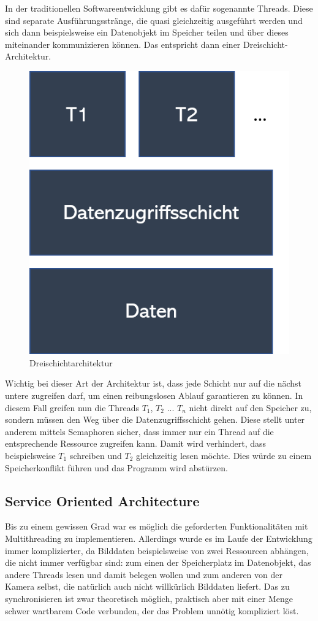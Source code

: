 In der traditionellen Softwareentwicklung gibt es dafür sogenannte Threads. Diese sind separate Ausführungsstränge, die quasi gleichzeitig ausgeführt werden und sich dann beispielsweise ein Datenobjekt im Speicher teilen und über dieses miteinander kommunizieren können. Das entspricht dann einer Dreischicht-Architektur.
\begin{figure}[h]
	\centering
	\includegraphics[scale=0.5]{"Grafiken/dreischichtarchitektur.png"}
	\caption{Dreischichtarchitektur}
	\label{fig:meine-grafik}
\end{figure}
Wichtig bei dieser Art der Architektur ist, dass jede Schicht nur auf die nächst untere zugreifen darf, um einen reibungslosen Ablauf garantieren zu können. In diesem Fall greifen nun die Threads $T_1$, $T_2$ ... $T_n$ nicht direkt auf den Speicher zu, sondern müssen den Weg über die Datenzugriffsschicht gehen. Diese stellt unter anderem mittels Semaphoren sicher, dass immer nur ein Thread auf die entsprechende Ressource zugreifen kann. Damit wird verhindert, dass beispielsweise $T_1$ schreiben und $T_2$ gleichzeitig lesen möchte. Dies würde zu einem Speicherkonflikt führen und das Programm wird abstürzen. \cite{riedel2019itarch}

\subsection{Service Oriented Architecture}
Bis zu einem gewissen Grad war es möglich die geforderten Funktionalitäten mit Multithreading zu implementieren. Allerdings wurde es im Laufe der Entwicklung immer komplizierter, da Bilddaten beispielsweise von zwei Ressourcen abhängen, die nicht immer verfügbar sind: zum einen der Speicherplatz im Datenobjekt, das andere Threads lesen und damit belegen wollen und zum anderen von der Kamera selbst, die natürlich auch nicht willkürlich Bilddaten liefert. Das zu synchronisieren ist zwar theoretisch möglich, praktisch aber mit einer Menge schwer wartbarem Code verbunden, der das Problem unnötig kompliziert löst.
